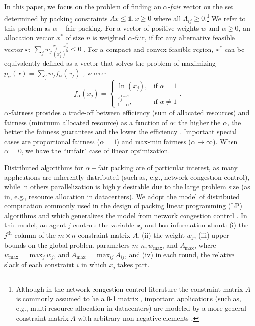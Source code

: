\documentclass[11pt]{article}
\begin{document}
In this paper, we focus on the problem of finding an {\em $\alpha$-fair} vector on the set determined by packing constraints $Ax\leq \mathds{1}, x\geq 0$ where all $A_{ij} \geq 0$.\footnote{Although in the network congestion control literature the constraint matrix $A$ is commonly assumed to be a 0-1 matrix \cite{kelly1998rate, kelly2014stochastic, yi2008stochastic, paganini2005congestion, MoWalrand2000, low2002internet}, important applications (such as, e.g., multi-resource allocation in datacenters) are modeled by a more general constraint matrix $A$ with arbitrary non-negative elements \cite{bonald2015multi, ghodsi2011dominant, joe2013multiresource, Im2014competitive}.} We refer to this problem as $\alpha-$fair packing. 
For a vector of positive weights $w$ and $\alpha\geq 0$, an allocation vector $x^*$ of size $n$ is weighted $\alpha$-fair, if for any alternative feasible vector $x$: $\sum_j w_j \frac{x_j-x_j^*}{(x_j^*)^\alpha}\leq 0$ \cite{MoWalrand2000}. For a compact and convex feasible region, $x^*$ can be equivalently defined as a vector that solves the problem of maximizing $p_{\alpha}(x) = \sum_j w_j f_{\alpha}(x_j)$ \cite{MoWalrand2000}, where: 
\begin{equation}
f_{\alpha}(x_j) = 
\begin{cases} \ln(x_j), & \mbox{if } \alpha=1 \\ \frac{x_j^{1-\alpha}}{1-\alpha}, & \mbox{if } \alpha\neq 1 \end{cases} \label{eq:f-alpha}.
\end{equation}
$\alpha$-fairness provides a trade-off between efficiency (sum of allocated resources) and fairness (minimum allocated resource) as a function of $\alpha$: the higher the $\alpha$, the better the fairness guarantees and the lower the efficiency \cite{atkinson1970measurement,bertsimas2012efficiency,lan2010axiomatic}.  Important special cases are 
proportional fairness ($\alpha = 1$) and max-min fairness ($\alpha \rightarrow \infty$).  When $\alpha = 0$, we have the ``unfair" case of  linear optimization.


Distributed algorithms for $\alpha-$fair packing are of particular interest, as many applications are inherently distributed (such as, e.g., network congestion control), while in others parallelization is highly desirable due to the large problem size (as in, e.g., resource allocation in datacenters). We adopt the model of distributed computation commonly used in the design of 
packing linear programming (LP) algorithms \cite{AwerbuchKhandekar2009, d-allen2014using, d-bartal1997global, d-kuhn2006price, d-luby1993parallel, d-papadimitriou1993linear} and which generalizes the model from network congestion control \cite{kelly2014stochastic}.  In this model, an agent $j$ controls the variable $x_j$ and has information about: (i) the $j^\text{th}$ column of the $m\times n$ constraint matrix $A$, (ii) the weight $w_j$, (iii) upper bounds on the global problem parameters $m, n, w_{\max}$, and $A_{\max}$, where $w_{\max} = \max_j w_j$, and $A_{\max} = \max_{ij} A_{ij}$, and (iv) in each round, the relative slack of each constraint $i$ in which $x_j$ takes part. 
\end{document}
